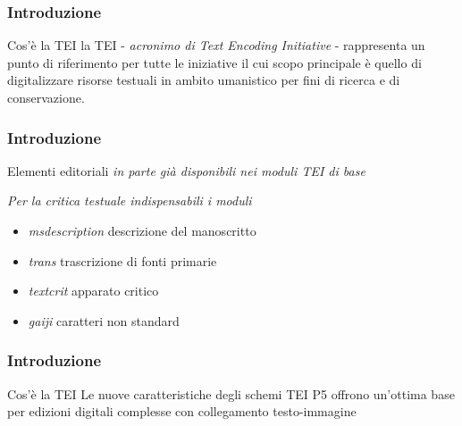 \begin{frame}
    \frametitle{Introduzione}
    \addtocounter{nframe}{1}
    

    \begin{block}{Cos'è la TEI}
        la TEI - \textit{acronimo di Text Encoding Initiative} - rappresenta un punto di riferimento per tutte le iniziative il cui scopo principale è quello di digitalizzare risorse testuali in ambito umanistico per fini di ricerca e di conservazione.
    \end{block}
    
\end{frame}

\begin{frame}
    \frametitle{Introduzione}
    \addtocounter{nframe}{1}
    

    \begin{block}{Elementi editoriali}
        \emph{in parte già disponibili nei moduli TEI di base}
        
        \textit{Per la critica testuale indispensabili i moduli}
        \begin{itemize}
            \item \emph{msdescription} descrizione del manoscritto 
            \item \emph{trans} trascrizione di fonti primarie 
            \item \emph{textcrit} apparato critico
            \item \emph{gaiji} caratteri non standard
        \end{itemize}
    \end{block}
    
\end{frame}

\begin{frame}
    \frametitle{Introduzione}
    \addtocounter{nframe}{1}
    

    \begin{block}{Cos'è la TEI}
        Le nuove caratteristiche degli schemi TEI P5 offrono un’ottima base per edizioni digitali complesse con collegamento testo-immagine
    \end{block}
    
\end{frame}



